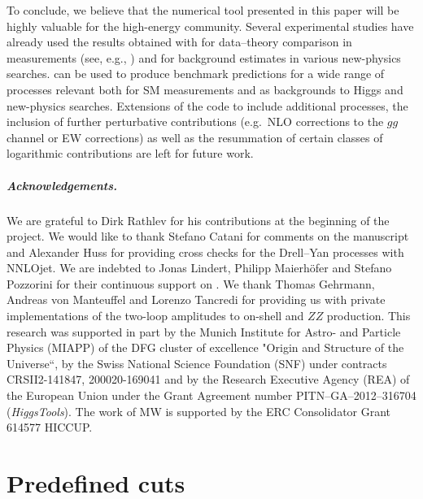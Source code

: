 \documentclass[english,11pt]{article}
\begin{document}
To conclude, we believe that the numerical tool presented in this paper will be highly valuable for
the high-energy community. 
Several experimental studies have already used the results obtained with \Matrix{} for data--theory 
comparison in \sm{} measurements (see, e.g., ) 
and for background estimates in various new-physics searches.
\Matrix{}\cite{MATRIX} can be used to produce benchmark
predictions for a wide range of processes relevant both for SM measurements 
and as backgrounds to Higgs and new-physics searches.
Extensions
of the code to include additional processes, the inclusion of further perturbative contributions (e.g.\ NLO corrections to the $gg$ channel or EW corrections) as well as the
resummation of certain classes of logarithmic contributions are left for future work.

\subparagraph{Acknowledgements.}

We are grateful to Dirk Rathlev for his contributions at the beginning of the \Matrix{} project.
We would like to thank Stefano Catani for comments on the manuscript and Alexander Huss for providing cross checks for the Drell--Yan processes with {\sc NNLOjet}.
We are indebted to Jonas Lindert, Philipp Maierh\"ofer and Stefano Pozzorini for their continuous support on \OpenLoops{}.
We thank Thomas Gehrmann, Andreas von Manteuffel and
Lorenzo Tancredi for providing us with private implementations of the two-loop amplitudes
to on-shell \ww{} and $ZZ$ production.
This research was supported in part by the Munich Institute for Astro- and Particle Physics (MIAPP) of the DFG cluster of excellence "Origin and Structure of the Universe``,
by the Swiss National Science Foundation (SNF) under 
contracts CRSII2-141847, 200020-169041 and by 
the Research Executive Agency (REA) of the European Union under the Grant Agreement 
number PITN--GA--2012--316704 ({\it HiggsTools}). 
The work of MW is supported by the ERC Consolidator Grant 614577 HICCUP.

\newpage
\appendix

\gdef\thesection{Appendix \Alph{section}}
\section{Predefined cuts}\label{app:cuts}
\gdef\thesection{\Alph{section}}
\end{document}
